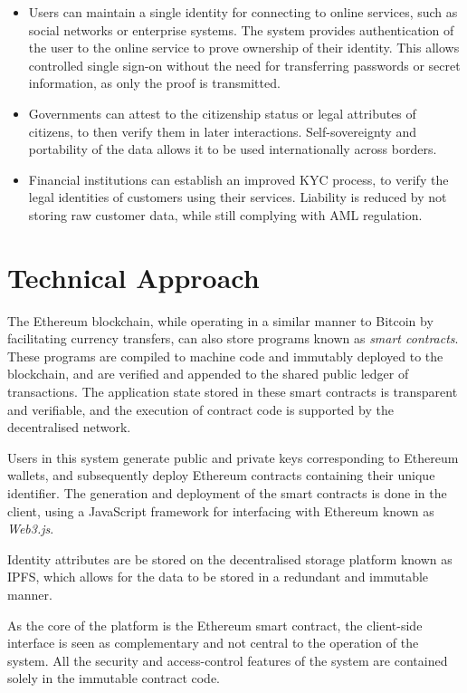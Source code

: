 \begin{itemize}
  \item Users can maintain a single identity for connecting to online services, such as social networks or enterprise systems. The system provides authentication of the user to the online service to prove ownership of their identity. This allows controlled single sign-on without the need for transferring passwords or secret information, as only the proof is transmitted.
  \item Governments can attest to the citizenship status or legal attributes of citizens, to then verify them in later interactions. Self-sovereignty and portability of the data allows it to be used internationally across borders.
  \item Financial institutions can establish an improved \ac{KYC} process, to verify the legal identities of customers using their services. Liability is reduced by not storing raw customer data, while still complying with \ac{AML} regulation.
\end{itemize}

\section{Technical Approach}
The Ethereum blockchain, while operating in a similar manner to Bitcoin by facilitating currency transfers, can also store programs known as \textit{smart contracts}. These programs are compiled to machine code and immutably deployed to the blockchain, and are verified and appended to the shared public ledger of transactions. The application state stored in these smart contracts is transparent and verifiable, and the execution of contract code is supported by the decentralised network. 

Users in this system generate public and private keys corresponding to Ethereum wallets, and subsequently deploy Ethereum contracts containing their unique identifier. The generation and deployment of the smart contracts is done in the client, using a JavaScript framework for interfacing with Ethereum known as \textit{Web3.js}.

Identity attributes are be stored on the decentralised storage platform known as \ac{IPFS}, which allows for the data to be stored in a redundant and immutable manner.

As the core of the platform is the Ethereum smart contract, the client-side interface is seen as complementary and not central to the operation of the system. All the security and access-control features of the system are contained solely in the immutable contract code.